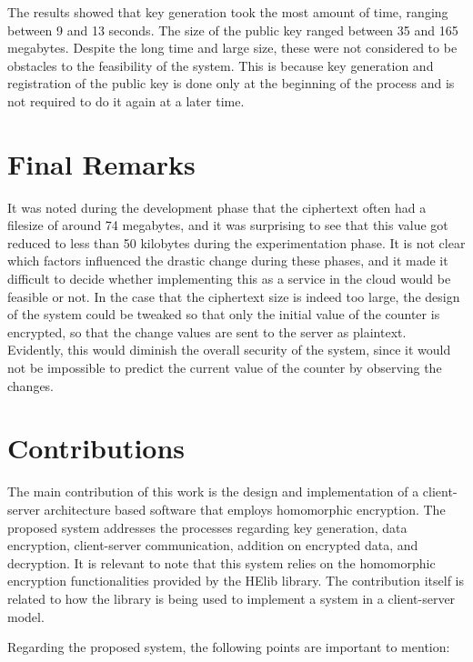 The results showed that key generation took the most amount of time, ranging between 9 and 13 seconds. The size of the public key ranged between 35 and 165 megabytes. Despite the long time and large size, these were not considered to be obstacles to the feasibility of the system. This is because key generation and registration of the public key is done only at the beginning of the process and is not required to do it again at a later time.

\section{Final Remarks}

It was noted during the development phase that the ciphertext often had a filesize of around 74 megabytes, and it was surprising to see that this value got reduced to less than 50 kilobytes during the experimentation phase. It is not clear which factors influenced the drastic change during these phases, and it made it difficult to decide whether implementing this as a service in the cloud would be feasible or not. In the case that the ciphertext size is indeed too large, the design of the system could be tweaked so that only the initial value of the counter is encrypted, so that the change values are sent to the server as plaintext. Evidently, this would diminish the overall security of the system, since it would not be impossible to predict the current value of the counter by observing the changes. 

\section{Contributions}

The main contribution of this work is the design and implementation of a client-server architecture based software that employs homomorphic encryption. The proposed system addresses the processes regarding key generation, data encryption, client-server communication, addition on encrypted data, and decryption. It is relevant to note that this system relies on the homomorphic encryption functionalities provided by the HElib library. The contribution itself is related to how the library is being used to implement a system in a client-server model.

Regarding the proposed system, the following points are important to mention:

